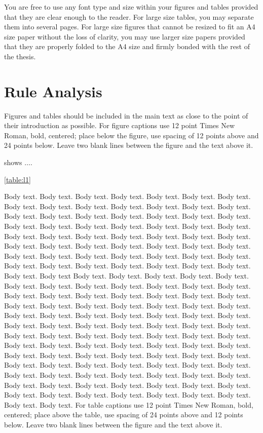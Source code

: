 You are free to use any font type and size within your figures and tables provided that they are clear enough to the reader. For large size tables, you may separate them into several pages. For large size figures that cannot be resized to fit an A4 size paper without the loss of clarity, you may use larger size papers provided that they are properly folded to the A4 size and firmly bonded with the rest of the thesis.

\section{Rule Analysis}

Figures and tables should be included in the main text as close to the point of their introduction as possible. For figure captions use 12 point Times New Roman, bold, centered; place below the figure, use spacing of 12 points above and 24 points below. Leave two blank lines between the figure and the text above it. 

 shows $\ldots$.


\ref{table:l1}


Body text. Body text. Body text. Body text. Body text. Body text. Body text. Body text. Body text. Body text. Body text. Body text. Body text. Body text. Body text. Body text. Body text. Body text. Body text. Body text. Body text. Body text. Body text. Body text. Body text. Body text. Body text. Body text. Body text. Body text. Body text. Body text. Body text. Body text. Body text. Body text. Body text. Body text. Body text. Body text. Body text. Body text. Body text. Body text. Body text. Body text. Body text. Body text. Body text. Body text. Body text. Body text. Body text. Body text. Body text. Body text. Body text. Body text
Body text. Body text. Body text. Body text. Body text. Body text. Body text. Body text. Body text. Body text. Body text. Body text. Body text. Body text. Body text. Body text. Body text. Body text. Body text. Body text. Body text. Body text. Body text. Body text. Body text. Body text. Body text. Body text. Body text. Body text. Body text. Body text. Body text. Body text. Body text. Body text. Body text. Body text. Body text. Body text. Body text. Body text. Body text. Body text. Body text. Body text. Body text. Body text. Body text. Body text. Body text. Body text. Body text. Body text. Body text. Body text. Body text. Body text. Body text. Body text. Body text. Body text. Body text. Body text. Body text. Body text. Body text. Body text. Body text. Body text. Body text. Body text. Body text. Body text. Body text. Body text. Body text. Body text. Body text. Body text. Body text. Body text. Body text. Body text. Body text. Body text. Body text. Body text. Body text. Body text. Body text.
For table captions use 12 point Times New Roman, bold, centered; place above the table, use spacing of 24 points above and 12 points below. Leave two blank lines between the figure and the text above it.

